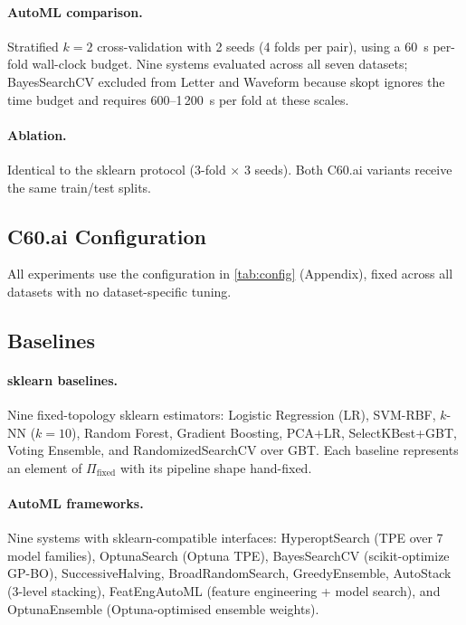 \documentclass{article}
\theoremstyle{definition}
\theoremstyle{plain}
\theoremstyle{remark}
\begin{document}
\paragraph{AutoML comparison.}
Stratified $k=2$ cross-validation with 2 seeds (4 folds per pair),
using a 60~s per-fold wall-clock budget.
Nine systems evaluated across all seven datasets;
BayesSearchCV excluded from Letter and Waveform because skopt ignores the
time budget and requires 600--1\,200~s per fold at these scales.

\paragraph{Ablation.}
Identical to the sklearn protocol (3-fold $\times$ 3 seeds).
Both C60.ai variants receive the same train/test splits.

\subsection{C60.ai Configuration}

All experiments use the configuration in \cref{tab:config} (Appendix),
fixed across all datasets with no dataset-specific tuning.

\subsection{Baselines}

\paragraph{sklearn baselines.}
Nine fixed-topology sklearn estimators: Logistic Regression (LR), SVM-RBF,
$k$-NN ($k{=}10$), Random Forest, Gradient Boosting, PCA+LR, SelectKBest+GBT,
Voting Ensemble, and RandomizedSearchCV over GBT.
Each baseline represents an element of $\Pi_{\mathrm{fixed}}$ with its
pipeline shape hand-fixed.

\paragraph{AutoML frameworks.}
Nine systems with sklearn-compatible interfaces:
HyperoptSearch (TPE over 7 model families),
OptunaSearch (Optuna TPE),
BayesSearchCV (scikit-optimize GP-BO),
SuccessiveHalving,
BroadRandomSearch,
GreedyEnsemble,
AutoStack (3-level stacking),
FeatEngAutoML (feature engineering + model search), and
OptunaEnsemble (Optuna-optimised ensemble weights).
\end{document}
